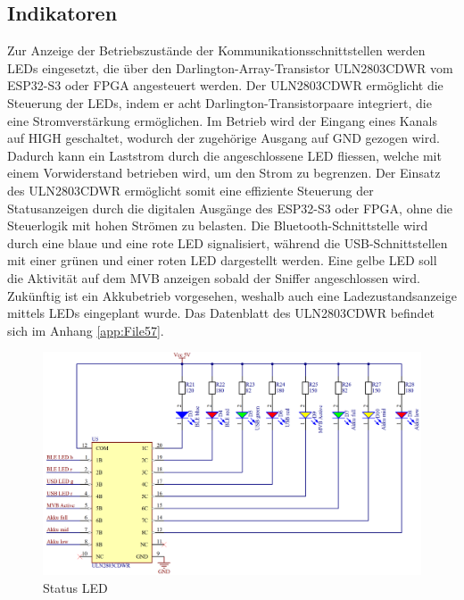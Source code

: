 \subsection{Indikatoren}
\label{subsec:Indikatoren}
Zur Anzeige der Betriebszustände der Kommunikationsschnittstellen werden LEDs eingesetzt, die über den Darlington-Array-Transistor ULN2803CDWR vom ESP32-S3 oder FPGA angesteuert werden. Der ULN2803CDWR ermöglicht die Steuerung der LEDs, indem er acht Darlington-Transistorpaare integriert, die eine Stromverstärkung ermöglichen. Im Betrieb wird der Eingang eines Kanals auf HIGH geschaltet, wodurch der zugehörige Ausgang auf GND gezogen wird. Dadurch kann ein Laststrom durch die angeschlossene LED fliessen, welche mit einem Vorwiderstand betrieben wird, um den Strom zu begrenzen. Der Einsatz des ULN2803CDWR ermöglicht somit eine effiziente Steuerung der Statusanzeigen durch die digitalen Ausgänge des ESP32-S3 oder FPGA, ohne die Steuerlogik mit hohen Strömen zu belasten. Die Bluetooth-Schnittstelle wird durch eine blaue und eine rote LED signalisiert, während die USB-Schnittstellen mit einer grünen und einer roten LED dargestellt werden. Eine gelbe LED soll die Aktivität auf dem MVB anzeigen sobald der Sniffer angeschlossen wird. Zukünftig ist ein Akkubetrieb vorgesehen, weshalb auch eine Ladezustandsanzeige mittels LEDs eingeplant wurde. 
Das Datenblatt des ULN2803CDWR befindet sich im Anhang \ref{app:File57}.
\begin{figure}
    \centering
    \includegraphics[width=0.9\linewidth]{Figures/Chap3/Schematics/Indicator_LEDs.png}
    \caption{Status LED}
    \label{fig:StateLED}
\end{figure}
